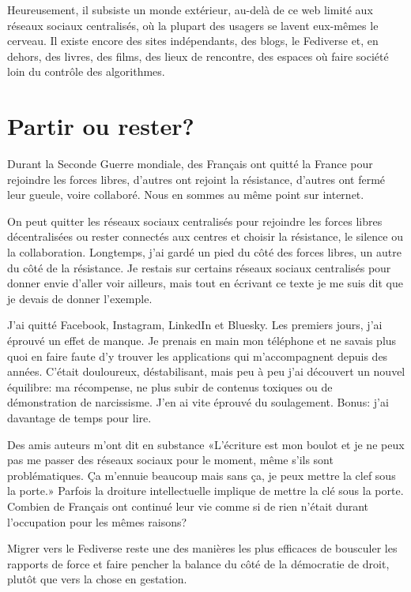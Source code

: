 \documentclass[a5paper, 10pt, twoside]{book}
\let\oldsection\section
\renewcommand{\section}[1]{%
  \oldsection{#1}%
  \par\vspace{\baselineskip}%
}
\begin{document}
Heureusement, il subsiste un monde extérieur, au-delà de ce web limité
aux réseaux sociaux centralisés, où la plupart des usagers se lavent
eux-mêmes le cerveau. Il existe encore des sites indépendants, des
blogs, le Fediverse et, en dehors, des livres, des films, des lieux de
rencontre, des espaces où faire société loin du contrôle des
algorithmes.

\section{\texorpdfstring{Partir ou rester?}{  }}\label{partir-ou-rester}

Durant la Seconde Guerre mondiale, des Français ont quitté la France
pour rejoindre les forces libres, d’autres ont rejoint la résistance,
d’autres ont fermé leur gueule, voire collaboré. Nous en sommes au même
point sur internet.

On peut quitter les réseaux sociaux centralisés pour rejoindre les
forces libres décentralisées ou rester connectés aux centres et choisir
la résistance, le silence ou la collaboration. Longtemps, j’ai gardé un
pied du côté des forces libres, un autre du côté de la résistance. Je
restais sur certains réseaux sociaux centralisés pour donner envie
d’aller voir ailleurs, mais tout en écrivant ce texte je me suis dit que
je devais de donner l’exemple.

J’ai quitté Facebook, Instagram, LinkedIn et Bluesky. Les premiers
jours, j’ai éprouvé un effet de manque. Je prenais en main mon téléphone
et ne savais plus quoi en faire faute d’y trouver les applications qui
m’accompagnent depuis des années. C’était douloureux, déstabilisant,
mais peu à peu j’ai découvert un nouvel équilibre: ma récompense, ne
plus subir de contenus toxiques ou de démonstration de narcissisme. J’en
ai vite éprouvé du soulagement. Bonus: j’ai davantage de temps pour
lire.

Des amis auteurs m’ont dit en substance «L’écriture est mon boulot et je
ne peux pas me passer des réseaux sociaux pour le moment, même s’ils
sont problématiques. Ça m’ennuie beaucoup mais sans ça, je peux mettre
la clef sous la porte.» Parfois la droiture intellectuelle implique de
mettre la clé sous la porte. Combien de Français ont continué leur vie
comme si de rien n’était durant l’occupation pour les mêmes raisons?

Migrer vers le Fediverse reste une des manières les plus efficaces de
bousculer les rapports de force et faire pencher la balance du côté de
la démocratie de droit, plutôt que vers la chose en gestation.
\end{document}
